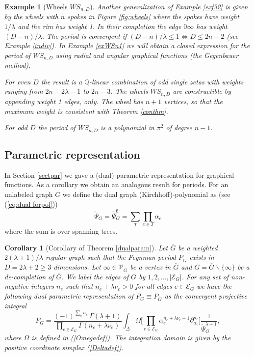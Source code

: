 \documentclass[oneside]{amsart}
\newcommand{\QQ}{{\mathbb Q}}
\newcommand{\Gg}{{\overline{G}}}
\newcommand{\sE}{\mathcal{E}}
\newcommand{\sV}{\mathcal{V}}
\theoremstyle{plain}
\newtheorem{cor}[thm]{Corollary}
\newtheorem{ex}[thm]{Example}
\begin{document}
\begin{ex}[Wheels $W\!S_{n,D}$]\label{exWSn}
Another generalization of Example \ref{exf32} is given by the wheels with $n$ spokes in Figure \ref{fig:wheels}
where the spokes have weight $1/\lambda$ and the rim has weight 1. In their completion the edge $0\infty$ has weight $(D-n)/\lambda$. The period
is convergent if $(D-n)/\lambda\leq1\Leftrightarrow D\leq2n-2$ (see Example \ref{indiv}). In Example \ref{exWSn1} we will obtain
a closed expression for the period of $W\!S_{n,D}$ using radial and angular graphical functions (the Gegenbauer method).

For even $D$ the result is a $\QQ$-linear combination of odd single zetas with weights ranging from $2n-2\lambda-1$ to $2n-3$.
The wheels $W\!S_{n,D}$ are constructible by appending weight 1 edges, only. The wheel has $n+1$ vertices, so that the maximum weight is consistent with Theorem \ref{conthm}.

For odd $D$ the period of $W\!S_{n,D}$ is a polynomial in $\pi^2$ of degree $n-1$.
\end{ex}

\subsection{Parametric representation}\label{sectparper}
In Section \ref{sectpar} we gave a (dual) parametric representation for graphical functions. As a corollary we obtain an analogous result for periods.
For an unlabeled graph $G$ we define the dual graph (Kirchhoff)-polynomial \cite{KIR} as (see (\ref{eq:dual-forpol}))
\begin{equation}\label{kirchdef}
\widetilde\Psi_G=\widetilde\Psi_G^\emptyset=\sum_T\prod_{e\in T}\alpha_e
\end{equation}
where the sum is over spanning trees.

\begin{cor}[Corollary of Theorem \ref{dualparam}]\label{dualparamper}
Let $\Gg$ be a weighted $2(\lambda+1)/\lambda$-regular graph such that the Feynman period $P_\Gg$ exists in $D=2\lambda+2\geq3$ dimensions.
Let $\infty\in\sV_\Gg$ be a vertex in $\Gg$ and $G=\Gg\backslash\{\infty\}$ be a de-completion of $\Gg$.
We label the edges of $G$ by $1,2,\ldots,|\sE_G|$. For any set of non-negative integers $n_e$ such that $n_e+\lambda\nu_e>0$ for all edges $e\in\sE_G$ we have the following
\emph{dual parametric representation} of $P_G\equiv P_\Gg$ as the convergent projective integral
\begin{equation}\label{fdualparamper}
P_G=\frac{(-1)^{\sum_e\!n_e}\,\Gamma(\lambda+1)}{\prod_{e\in\sE_G}\Gamma(n_e+\lambda\nu_e)}\int_\Delta\Omega\Big[\prod_{e\in\sE_G}\alpha_e^{n_e+\lambda\nu_e-1}\partial_{\alpha_e}^{n_e}\Big]
\frac{1}{\widetilde\Psi_G^{\lambda+1}},
\end{equation}
where $\Omega$ is defined in (\ref{Omegadef}). The integration domain is given by the positive coordinate simplex (\ref{Deltadef}).
\end{cor}
\end{document}
